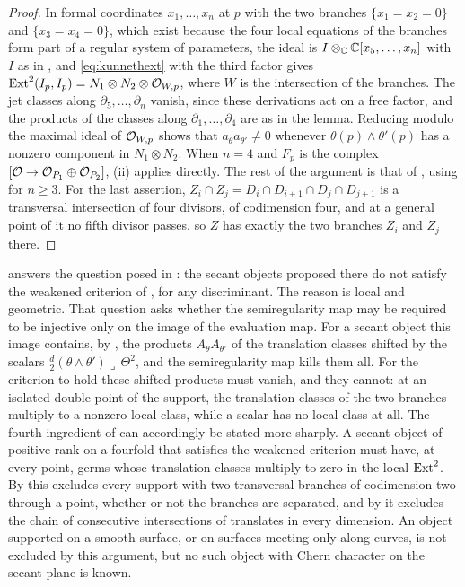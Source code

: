 \begin{proof}
In formal coordinates $x_{1},\dots,x_{n}$ at $p$ with the two branches
$\{x_{1}=x_{2}=0\}$ and $\{x_{3}=x_{4}=0\}$, which exist because the four
local equations of the branches form part of a regular system of
parameters, the ideal is
$I\otimes_{\mathbb{C}}\mathbb{C}[x_{5},\dots,x_{n}]$ with $I$ as in ,
and \eqref{eq:kunnethext} with the third factor gives
$\operatorname{Ext}^{2}(I_{p},I_{p})=N_{1}\otimes N_{2}\otimes\mathcal{O}_{W,p}$, where $W$ is the
intersection of the branches. The jet classes along $\partial_{5},\dots,\partial_{n}$
vanish, since these derivations act on a free factor, and the products of the
classes along $\partial_{1},\dots,\partial_{4}$ are as in the lemma. Reducing
modulo the maximal ideal of $\mathcal{O}_{W,p}$ shows that $a_{\theta}a_{\theta'}\ne0$
whenever $\theta(p)\wedge\theta'(p)$ has a nonzero component in
$N_{1}\otimes N_{2}$. When $n=4$ and $F_{p}$ is the complex
$[\mathcal{O}\to\mathcal{O}_{P_{1}}\oplus\mathcal{O}_{P_{2}}]$, (ii) applies
directly. The rest of the argument is that of
, using  for $n\ge3$. For the last
assertion, $Z_{i}\cap Z_{j}=D_{i}\cap D_{i+1}\cap D_{j}\cap D_{j+1}$ is a
transversal intersection of four divisors, of codimension four, and at a
general point of it no fifth divisor passes, so $Z$ has exactly the two
branches $Z_{i}$ and $Z_{j}$ there.
\end{proof}

\begin{remark}\label{rem:candidatemeaning}
 answers the question posed in
\cite[Section 12]{Mar25b}: the secant objects proposed there do not satisfy
the weakened criterion of \cite[Question 11.4]{Mar25b}, for any
discriminant. The reason is local and geometric. That question asks whether
the semiregularity map may be required to be injective only on the image of
the evaluation map. For a secant object this image contains, by
, the products $A_{\theta}A_{\theta'}$ of the translation
classes shifted by the scalars
$\tfrac d2(\theta\wedge\theta')\lrcorner\,\Theta^{2}$, and the
semiregularity map kills them all. For the criterion to hold these shifted
products must vanish, and they cannot: at an isolated double point of the
support, the translation classes of the two branches multiply to a nonzero
local class, while a scalar has no local class at all. The fourth ingredient
of \cite[Remark~14.16]{paperI} can accordingly be stated more sharply. A secant
object of positive rank on a fourfold that satisfies the weakened criterion
must have, at every point, germs whose translation classes multiply to zero
in the local $\operatorname{Ext}^{2}$. By  this excludes every
support with two transversal branches of codimension two through a point,
whether or not the branches are separated, and by
 it excludes the chain of consecutive
intersections of translates in every dimension. An object supported on a
smooth surface, or on surfaces meeting only along curves, is not excluded by
this argument, but no such object with Chern character on the secant plane
is known.
\end{remark}
